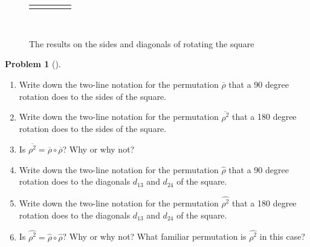 \documentclass[10pt,]{book}
\theoremstyle{plain}
\theoremstyle{definition}
\newtheorem{activity}[project]{Problem}
\theoremstyle{definition}
\numberwithin{equation}{chapter}
\newlength{\panelmax}
\begin{document}
\begin{figure}
{\begin{tabular}{@{}*{5}{c}@{}}
\begin{minipage}[c][\panelmax][t]{0.19\linewidth}\usebox{\panelboxAHimage}\end{minipage}&
\begin{minipage}[c][\panelmax][t]{0.19\linewidth}\usebox{\panelboxAIimage}\end{minipage}&
\begin{minipage}[c][\panelmax][t]{0.19\linewidth}\usebox{\panelboxAJimage}\end{minipage}&
\begin{minipage}[c][\panelmax][t]{0.19\linewidth}\usebox{\panelboxAKimage}\end{minipage}\end{tabular}\\
}%
\caption{The results on the sides and diagonals of rotating the square\label{rotate-square}}
\end{figure}
\begin{activity}[]\marginsymbol[-1em]{} \label{activity-279}
\leavevmode%
\begin{enumerate}[font=\bfseries,label=(\alph*),ref=\alph*]
\item\label{task-199} \marginsymbol[-2.5em]{} Write down the two-line notation for the permutation \(\overline{\rho}\) that a \(90\) degree rotation does to the sides of the square.%
\item\label{task-200} \marginsymbol[-2.5em]{} Write down the two-line notation for the permutation \(\overline{\rho^2}\) that  a 180 degree rotation does to the sides of the square.%
\item\label{task-201} \marginsymbol[-2.5em]{} Is \(\overline{\rho^2} = \overline\rho\circ\overline\rho\)? Why or why not?%
\item\label{task-202} \marginsymbol[-2.5em]{} Write down the two-line notation for the permutation \(\widehat{\rho}\) that a 90 degree rotation does to the diagonals \(d_{13}\) and \(d_{24}\) of the square.%
\item\label{task-203} \marginsymbol[-2.5em]{} Write down the two-line notation for the permutation \(\widehat{\rho^2}\) that a 180 degree rotation does to the diagonals \(d_{13}\) and \(d_{24}\) of the square.%
\item\label{task-204} \marginsymbol[-2.5em]{} Is \(\widehat{\rho^2} = \widehat{\rho}\circ\widehat{\rho}\)? Why or why not? What familiar permutation is \(\widehat{\rho^2}\) in this case?%
\end{enumerate}
\end{activity}
\end{document}
